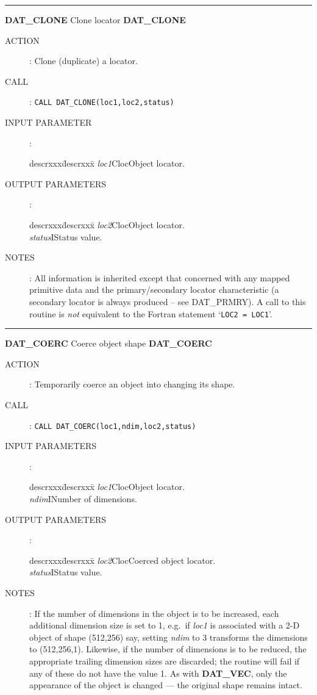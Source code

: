 \rule{\textwidth}{0.3mm}
{\Large {\bf DAT\_CLONE} \hfill Clone locator \hfill {\bf DAT\_CLONE}}
\begin{description}
\item [ACTION]:
Clone (duplicate) a locator.
\item [CALL]:
{\tt CALL DAT\_CLONE(loc1,loc2,status)}
\item [INPUT PARAMETER]:
\begin{tabbing}
descrxxx\=descrxxx\=\kill
{\em loc1}\>Cloc\>Object locator.
\end{tabbing}
\item [OUTPUT PARAMETERS]:
\begin{tabbing}
descrxxx\=descrxxx\=\kill
{\em loc2}\>Cloc\>Object locator.\\
{\em status}\>I\>Status value.
\end{tabbing}
\item [NOTES]:
All information is inherited except that concerned with any mapped primitive
data and the primary/secondary locator characteristic (a secondary locator is
always produced -- see DAT\_PRMRY). A call to this routine is {\em not}
equivalent to the Fortran statement `\verb+LOC2 = LOC1+'.
\end{description}
\goodbreak
\rule{\textwidth}{0.3mm}
{\Large {\bf DAT\_COERC} \hfill Coerce object shape \hfill {\bf DAT\_COERC}}
\begin{description}
\item [ACTION]:
Temporarily coerce an object into changing its shape.
\item [CALL]:
{\tt CALL DAT\_COERC(loc1,ndim,loc2,status)}
\item [INPUT PARAMETERS]:
\begin{tabbing}
descrxxx\=descrxxx\=\kill
{\em loc1}\>Cloc\>Object locator.\\
{\em ndim}\>I\>Number of dimensions.
\end{tabbing}
\item [OUTPUT PARAMETERS]:
\begin{tabbing}
descrxxx\=descrxxx\=\kill
{\em loc2}\>Cloc\>Coerced object locator.\\
{\em status}\>I\>Status value.
\end{tabbing}
\item [NOTES]:
If the number of dimensions in the object is to be increased, each additional
dimension size is set to 1, e.g.\ if {\em loc1} is associated with a 2-D object
of shape (512,256) say, setting {\em ndim} to 3 transforms the dimensions to
(512,256,1).
Likewise, if the number of dimensions is to be reduced, the appropriate trailing
dimension sizes are discarded; the routine will fail if any of these do not have
the value 1.
As with {\bf DAT\_VEC}, only the appearance of the object is changed --- the
original shape remains intact.
\end{description}
